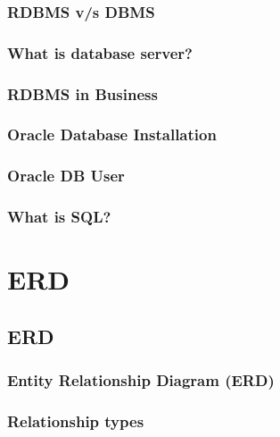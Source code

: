 \documentclass[14pt,fleqn]{extbook} %
\begin{document}
\subsection{RDBMS v/s DBMS}

\subsection{What is database server?}

\subsection{RDBMS in Business}

%
\subsection{Oracle Database Installation}

\subsection{Oracle DB User}

\subsection{What is SQL?}



%
\chapter{ERD}
\section{ERD}
\subsection{Entity Relationship Diagram (ERD)}

\subsection{Relationship types}

\end{document}
